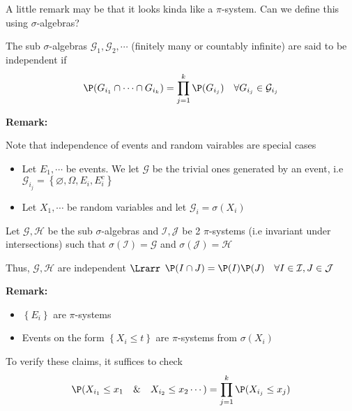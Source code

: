 \noindent A little remark may be that it looks kinda like a $\pi$-system. Can we define this using $\sigma$-algebras?
\par\bigskip
\begin{defo}[]{}
  The sub $\sigma$-algebras $\mathcal{G}_1,\mathcal{G}_2,\cdots$ (finitely many or countably infinite) are said to be independent if
  \begin{equation*}
    \begin{gathered}
      \P(G_{i_1}\cap\cdots\cap G_{i_k}) = \prod_{j=1}^{k}\P(G_{i_j})\quad\forall G_{i_j}\in\mathcal{G}_{i_j}
    \end{gathered}
  \end{equation*}
\end{defo}
\par\bigskip
\noindent\textbf{Remark:}\par
\noindent Note that independence of events and random vairables are special cases\par
\begin{itemize}
\item Let $E_1,\cdots$ be events. We let $\mathcal{G}$ be the trivial ones generated by an event, i.e $\mathcal{G}_{i_j} = \left\{\varnothing, \Omega, E_i,E_i^c\right\}$
\item Let $X_1,\cdots$ be random variables and let $\mathcal{G}_i = \sigma(X_i)$
\end{itemize}
\par\bigskip
\begin{lem}[]{}
  Let $\mathcal{G},\mathcal{H}$ be the sub $\sigma$-algebras and $\mathcal{I}, \mathcal{J}$ be 2 $\pi$-systems (i.e invariant under intersections) such that $\sigma(\mathcal{I}) = \mathcal{G}$ and $\sigma(\mathcal{J}) = \mathcal{H}$
  \par\bigskip
  \noindent Thus, $\mathcal{G}, \mathcal{H}$ are independent $\Lrarr$ $\P(I\cap J) = \P(I)\P(J)\quad\forall I\in\mathcal{I}, J\in\mathcal{J}$
\end{lem}
\par\bigskip
\noindent\textbf{Remark:}\par
\begin{itemize}
\item$\left\{E_i\right\}$ are $\pi$-systems
\item Events on the form $\left\{X_i\leq t\right\}$ are $\pi$-systems from $\sigma(X_i)$
\end{itemize}\par
\noindent To verify these claims, it suffices to check 
\begin{equation*}
  \begin{gathered}
    \P(X_{i_1}\leq x_1\quad\&\quad X_{i_2}\leq x_2\cdots) = \prod_{j=1}^{k}\P(X_{i_j}\leq x_j)
  \end{gathered}
\end{equation*}

